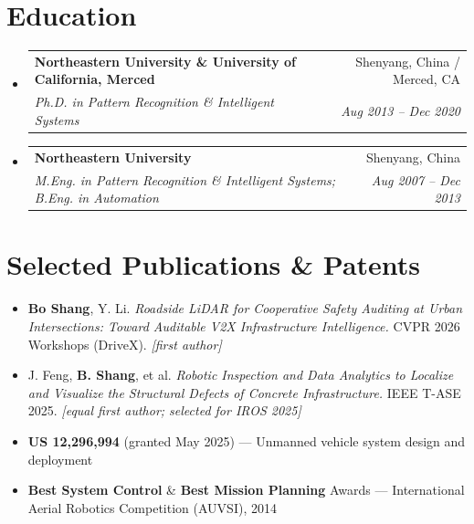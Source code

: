 \documentclass[letterpaper,10pt]{article}
\makeatletter
\newcommand{\resumeBullet}[1]{
  \item\small{#1 \vspace{-2pt}}
}
\newcommand{\resumeSubheading}[4]{
  \vspace{-1pt}\item
    \begin{tabular*}{0.97\textwidth}{l@{\extracolsep{\fill}}r}
      \textbf{#1} & #2 \\
      \textit{\small#3} & \textit{\small #4} \\
    \end{tabular*}\vspace{-5pt}
}
\newcommand{\resumeSubHeadingListStart}{\begin{itemize}[leftmargin=*]}
\newcommand{\resumeSubHeadingListEnd}{\end{itemize}}
\makeatother
\begin{document}
\section{Education}
  \resumeSubHeadingListStart
    \resumeSubheading
      {Northeastern University \& University of California, Merced}{Shenyang, China / Merced, CA}
      {Ph.D. in Pattern Recognition \& Intelligent Systems}{Aug 2013 -- Dec 2020}
    \resumeSubheading
      {Northeastern University}{Shenyang, China}
      {M.Eng. in Pattern Recognition \& Intelligent Systems; B.Eng. in Automation}{Aug 2007 -- Dec 2013}
  \resumeSubHeadingListEnd

\section{Selected Publications \& Patents}
  \resumeSubHeadingListStart
    \resumeBullet{\textbf{Bo Shang}, Y. Li. \textit{Roadside LiDAR for Cooperative Safety Auditing at Urban Intersections: Toward Auditable V2X Infrastructure Intelligence.} CVPR 2026 Workshops (DriveX). \textit{[first author]}}
    \resumeBullet{J. Feng, \textbf{B. Shang}, et al. \textit{Robotic Inspection and Data Analytics to Localize and Visualize the Structural Defects of Concrete Infrastructure.} IEEE T-ASE 2025. \textit{[equal first author; selected for IROS 2025]}}
    \resumeBullet{\textbf{US 12,296,994} (granted May 2025) --- Unmanned vehicle system design and deployment}
    \resumeBullet{\textbf{Best System Control} \& \textbf{Best Mission Planning} Awards --- International Aerial Robotics Competition (AUVSI), 2014}
  \resumeSubHeadingListEnd
\end{document}
